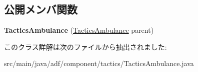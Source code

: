 \subsection*{公開メンバ関数}
\begin{DoxyCompactItemize}
\item 
\hypertarget{classadf_1_1component_1_1tactics_1_1TacticsAmbulance_a8fd24c74ddb0d41ef1ad2d133312d0e4}{}\label{classadf_1_1component_1_1tactics_1_1TacticsAmbulance_a8fd24c74ddb0d41ef1ad2d133312d0e4} 
{\bfseries Tactics\+Ambulance} (\hyperlink{classadf_1_1component_1_1tactics_1_1TacticsAmbulance}{Tactics\+Ambulance} parent)
\end{DoxyCompactItemize}


このクラス詳解は次のファイルから抽出されました\+:\begin{DoxyCompactItemize}
\item 
src/main/java/adf/component/tactics/Tactics\+Ambulance.\+java\end{DoxyCompactItemize}
